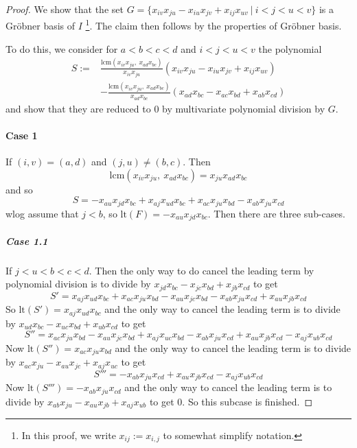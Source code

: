 \documentclass{scrartcl}
\theoremstyle{definition}
\begin{document}
\begin{proof}
    We show that the set $G = \{ x_{iv} x_{ju} - x_{iu} x_{jv} + x_{ij} x_{uv} \ | \ i < j < u < v \}$ is a Gröbner basis of $I$
    \footnote{In this proof, we write $x_{ij} := x_{i, j}$ to somewhat simplify notation.}.
    The claim then follows by the properties of Gröbner basis.

    To do this, we consider for $a < b < c < d$ and $i < j < u < v$ the polynomial
    \begin{align*}
        S := &\frac {\mathrm{lcm}(x_{iv} x_{ju}, \ x_{ad} x_{bc})} {x_{iv} x_{ju}} (x_{iv} x_{ju} - x_{iu} x_{jv} + x_{ij} x_{uv}) \\
        &- \frac {\mathrm{lcm}(x_{iv} x_{ju}, \ x_{ad} x_{bc})} {x_{ad} x_{bc}} (x_{ad} x_{bc} - x_{ac} x_{bd} + x_{ab} x_{cd})
    \end{align*}
    and show that they are reduced to $0$ by multivariate polynomial division by $G$.

    \paragraph{Case 1} If $(i, v) = (a, d)$ and $(j, u) \neq (b, c)$. Then
    \begin{equation*}
        \mathrm{lcm}(x_{iv} x_{ju}, \ x_{ad} x_{bc}) = x_{ju} x_{ad} x_{bc}
    \end{equation*}
    and so
    \begin{equation*}
        S = -x_{au} x_{jd} x_{bc} + x_{aj} x_{ud} x_{bc} + x_{ac} x_{ju} x_{bd} - x_{ab} x_{ju} x_{cd}
    \end{equation*}
    wlog assume that $j < b$, so $\mathrm{lt}(F) = -x_{au} x_{jd} x_{bc}$.
    Then there are three sub-cases.
    \subparagraph{Case 1.1} If $j < u < b < c < d$. 
    Then the only way to do cancel the leading term by polynomial division is to divide by $x_{jd} x_{bc} - x_{jc} x_{bd} + x_{jb} x_{cd}$ to get
    \begin{equation*}
        S' = x_{aj} x_{ud} x_{bc} + x_{ac} x_{ju} x_{bd} - x_{au} x_{jc} x_{bd} - x_{ab} x_{ju} x_{cd} + x_{au} x_{jb} x_{cd}
    \end{equation*}
    So $\mathrm{lt}(S') = x_{aj} x_{ud} x_{bc}$ and the only way to cancel the leading term is to divide by $x_{ud} x_{bc} - x_{uc} x_{bd} + x_{ub} x_{cd}$ to get
    \begin{equation*}
        S'' = x_{ac} x_{ju} x_{bd} - x_{au} x_{jc} x_{bd} + x_{aj} x_{uc} x_{bd} - x_{ab} x_{ju} x_{cd} + x_{au} x_{jb} x_{cd} - x_{aj} x_{ub} x_{cd}
    \end{equation*}
    Now $\mathrm{lt}(S'') = x_{ac} x_{ju} x_{bd}$ and the only way to cancel the leading term is to divide by $x_{ac} x_{ju} - x_{au} x_{jc} + x_{aj} x_{uc}$ to get
    \begin{equation*}
        S''' = -x_{ab} x_{ju} x_{cd} + x_{au} x_{jb} x_{cd} - x_{aj} x_{ub} x_{cd}
    \end{equation*}
    Now $\mathrm{lt}(S''') = -x_{ab} x_{ju} x_{cd}$ and the only way to cancel the leading term is to divide by $x_{ab} x_{ju} - x_{au} x_{jb} + x_{aj} x_{ub}$ to get $0$.
    So this subcase is finished.


\end{proof}
\end{document}
